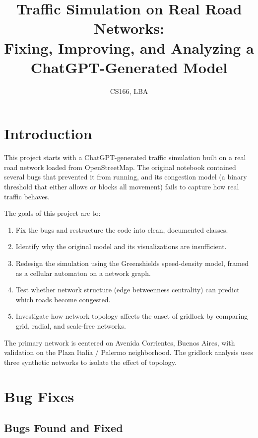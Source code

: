 \documentclass[12pt]{article}
\title{Traffic Simulation on Real Road Networks:\\Fixing, Improving, and Analyzing a ChatGPT-Generated Model}
\author{}
\date{CS166, LBA}
\begin{document}
\maketitle
\setcounter{tocdepth}{1}
\tableofcontents
\newpage

\section{Introduction}

This project starts with a ChatGPT-generated traffic simulation built on a real road network loaded from OpenStreetMap. The original notebook contained several bugs that prevented it from running, and its congestion model (a binary threshold that either allows or blocks all movement) fails to capture how real traffic behaves.

The goals of this project are to:
\begin{enumerate}
    \item Fix the bugs and restructure the code into clean, documented classes.
    \item Identify why the original model and its visualizations are insufficient.
    \item Redesign the simulation using the Greenshields speed-density model, framed as a cellular automaton on a network graph.
    \item Test whether network structure (edge betweenness centrality) can predict which roads become congested.
    \item Investigate how network topology affects the onset of gridlock by comparing grid, radial, and scale-free networks.
\end{enumerate}

The primary network is centered on Avenida Corrientes, Buenos Aires, with validation on the Plaza Italia / Palermo neighborhood. The gridlock analysis uses three synthetic networks to isolate the effect of topology.


\section{Bug Fixes}

\subsection{Bugs Found and Fixed}
\end{document}

